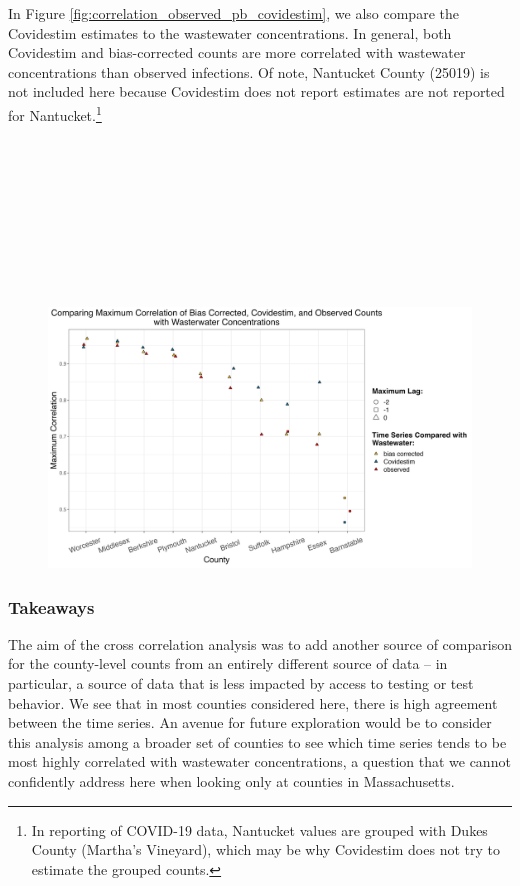 \documentclass[12pt,twoside]{smiththesis}
\begin{document}
In Figure \ref{fig:correlation_observed_pb_covidestim}, we also compare the Covidestim estimates to the wastewater concentrations. In general, both Covidestim and bias-corrected counts are more correlated with wastewater concentrations than observed infections. Of note, Nantucket County (25019) is not included here because Covidestim does not report estimates are not reported for Nantucket.\footnote{In reporting of COVID-19 data, Nantucket values are grouped with Dukes County (Martha's Vineyard), which may be why Covidestim does not try to estimate the grouped counts.}

~

~

~

~

~
\begin{figure}
\includegraphics[width=1\linewidth]{figure/correlation_observed_pb_covidestim} \caption{\label{fig:correlation_observed_pb_covidestim}}\label{fig:unnamed-chunk-92}
\end{figure}
\hypertarget{takeaways}{%
\subsubsection{Takeaways}\label{takeaways}}

The aim of the cross correlation analysis was to add another source of comparison for the county-level counts from an entirely different source of data -- in particular, a source of data that is less impacted by access to testing or test behavior. We see that in most counties considered here, there is high agreement between the time series. An avenue for future exploration would be to consider this analysis among a broader set of counties to see which time series tends to be most highly correlated with wastewater concentrations, a question that we cannot confidently address here when looking only at counties in Massachusetts.
\end{document}

